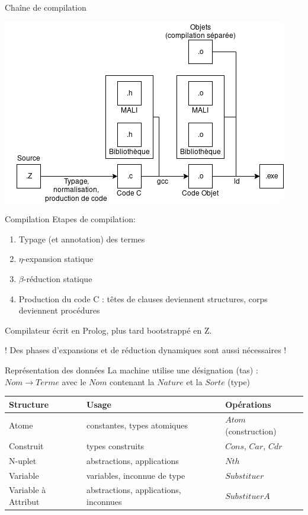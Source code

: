 \documentclass[aspectratio=169]{beamer}
\begin{document}
\begin{frame}{Chaîne de compilation}
  \begin{center}
    \includegraphics[width=.5\paperwidth]{assets/mali-chain.png}
  \end{center}
\end{frame}

\begin{frame}{Compilation}
  Etapes de compilation:
  \begin{enumerate}
  \item Typage (et annotation) des termes
  \item $\eta$-expansion statique
  \item $\beta$-réduction statique
  \item Production du code C : têtes de clauses deviennent structures, corps deviennent procédures
  \end{enumerate}
  Compilateur écrit en Prolog, plus tard bootstrappé en Z.

  ! Des phases d'expansions et de réduction dynamiques sont aussi nécessaires !
\end{frame}

\begin{frame}{Représentation des données}
  La machine utilise une désignation (tas) : $Nom \rightarrow Terme$
  avec le $Nom$ contenant la $Nature$ et la $Sorte$ (type)
  \begin{table}
  \begin{tabular}{l|l|l}
    Structure & Usage & Opérations\\
    \hline
    Atome & constantes, types atomiques & $Atom$ (construction) \\
    Construit & types construits & $Cons$, $Car$, $Cdr$\\
    N-uplet & abstractions, applications & $Nth$\\
    Variable & variables, inconnue de type & $Substituer$\\
    Variable à Attribut & abstractions, applications, inconnues & $SubstituerA$\\
    \hline
  \end{tabular}
  \end{table}
\end{frame}
\end{document}
